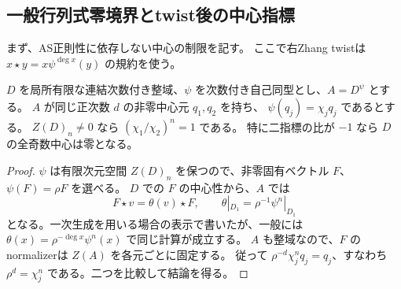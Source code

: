 \subsection{一般行列式零境界とtwist後の中心指標}
\label{subsec:cubic-as4-boundary-R}
まず、AS正則性に依存しない中心の制限を記す。
ここで右Zhang twistは $x\star y=x\psi^{\deg x}(y)$ の規約を使う。

\begin{lemma}\label{lem:cubic-twist-central-weights}
$D$ を局所有限な連結次数付き整域、$\psi$ を次数付き自己同型とし、$A=D^\psi$ とする。
$A$ が同じ正次数 $d$ の非零中心元 $q_1,q_2$ を持ち、
$\psi(q_j)=\chi_jq_j$ であるとする。
$Z(D)_n\ne0$ なら $(\chi_1/\chi_2)^n=1$ である。
特に二指標の比が $-1$ なら $D$ の全奇数中心は零となる。
\end{lemma}
\begin{proof}
$\psi$ は有限次元空間 $Z(D)_n$ を保つので、非零固有ベクトル $F$、
$\psi(F)=\rho F$ を選べる。
$D$ での $F$ の中心性から、$A$ では
\[
 F\star v=\theta(v)\star F,\qquad
 \theta|_{D_1}=\rho^{-1}\psi^n|_{D_1}
\]
となる。一次生成を用いる場合の表示で書いたが、一般には
$\theta(x)=\rho^{-\deg x}\psi^n(x)$ で同じ計算が成立する。
$A$ も整域なので、$F$ のnormalizerは $Z(A)$ を各元ごとに固定する。
従って $\rho^{-d}\chi_j^nq_j=q_j$、すなわち
$\rho^d=\chi_j^n$ である。二つを比較して結論を得る。
\end{proof}

